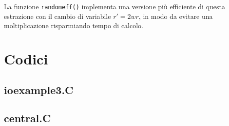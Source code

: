 \documentclass[10pt]{article}
\newcommand{\ttt}{\texttt}
\begin{document}
La funzione \ttt{randomeff()} implementa una versione più efficiente di questa estrazione con il cambio di variabile \(r' = 2wr\), in modo da evitare una moltiplicazione risparmiando tempo di calcolo.

\newpage
\section{Codici}

\subsection{ioexample3.C}


\newpage

\subsection{central.C}

\end{document}
